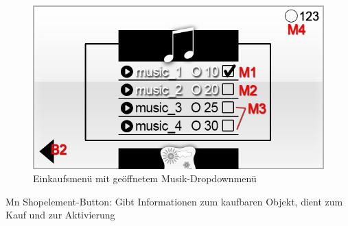 
\begin{figure}[H]
\centering
\includegraphics[scale=0.55]{../gui/_jpeg_numeration/shop_popup.jpg}
\caption{Einkaufsmenü mit geöffnetem Musik-Dropdownmenü}
\label{fig:Einkaufsmenu_Dropdown}
\end{figure}
\begin{description*}
\item[Mn] Shopelement-Button: Gibt Informationen zum kaufbaren Objekt, dient zum Kauf und zur Aktivierung
\end{description*}
